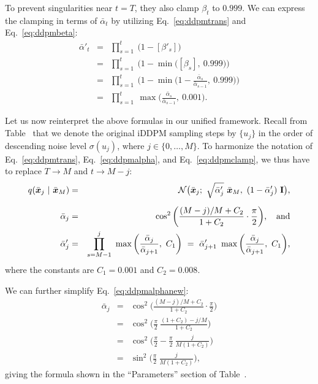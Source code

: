 To prevent singularities near $t = T$, they also clamp $\beta_t$ to $0.999$.
We can express the clamping in terms of $\bar\alpha_t$ by utilizing Eq.~\ref{eq:ddpmtrans} and Eq.~\ref{eq:ddpmbeta}:
\begin{eqnarray}
  \label{eq:ddpmclamp}
  \bar\alpha'_t &=& \prod_{s=1}^t ~\big( 1 - [\beta'_s] \big) \\
  &=& \prod_{s=1}^t ~\Big( 1 - \min\big( [\beta_s], ~0.999) \Big) \\
  &=& \prod_{s=1}^t ~\bigg( 1 - \min\bigg( 1 - \frac{\bar\alpha_s}{\bar\alpha_{s-1}}, ~0.999 \bigg) \bigg) \\
  &=& \prod_{s=1}^t ~\max\bigg( \frac{\bar\alpha_s}{\bar\alpha_{s-1}}, ~0.001 \bigg)
  \text{.}
\end{eqnarray}

Let us now reinterpret the above formulas in our unified framework.
Recall from Table~ that we denote the original iDDPM sampling steps by $\{u_j\}$ in the order of descending noise level $\sigma(u_j)$, where $j \in \{0, \dots, M\}$.
To harmonize the notation of Eq.~\ref{eq:ddpmtrans}, Eq.~\ref{eq:ddpmalpha}, and Eq.~\ref{eq:ddpmclamp}, we thus have to replace $T \longrightarrow M$ and $t \longrightarrow M-j$:
\begin{eqnarray}
  q(\bar{\boldsymbol{x}}_j ~|~ \bar{\boldsymbol{x}}_M) &=& \mathcal{N}\big( \bar{\boldsymbol{x}}_j; ~\sqrt{\bar\alpha'_j} ~\bar{\boldsymbol{x}}_M, ~(1 - \bar\alpha'_j) ~\mathbf{I} \big) \label{eq:ddpmtransnew} \text{,} \\[2mm]
  \bar\alpha_j &=& \cos^2 \bigg( \frac{(M - j) / M + C_2}{1 + C_2} \cdot \frac{\pi}{2} \bigg) \label{eq:ddpmalphanew} \text{,}\hspace{4mm}\text{and} \\
  \bar\alpha'_j &=& \prod_{s=M-1}^j ~\max\bigg( \frac{\bar\alpha_j}{\bar\alpha_{j+1}}, ~C_1 \bigg) ~=~ \bar\alpha'_{j+1} ~\max\bigg( \frac{\bar\alpha_j}{\bar\alpha_{j+1}}, ~C_1 \bigg) \label{eq:ddpmclampnew}
  \text{,}
\end{eqnarray}
where the constants are $C_1 = 0.001$ and $C_2 = 0.008$.

We can further simplify Eq.~\ref{eq:ddpmalphanew}:
\begin{eqnarray}
  \bar\alpha_j &=& \cos^2 \bigg( \frac{(M - j) / M + C_2}{1 + C_2} \cdot \frac{\pi}{2} \bigg) \\
  &=& \cos^2 \bigg( \frac{\pi}{2} ~\frac{(1 + C_2) - j / M}{1 + C_2} \bigg)\\
  &=& \cos^2 \bigg( \frac{\pi}{2} - \frac{\pi}{2} ~\frac{j}{M (1 + C_2)} \bigg)\\
  &=& \sin^2 \bigg( \frac{\pi}{2} ~\frac{j}{M (1 + C_2)} \bigg)
  \text{,}
\end{eqnarray}
giving the formula shown in the ``Parameters'' section of Table~.

